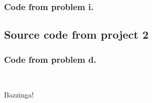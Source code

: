 \documentclass{article}
\begin{document}
\hypertarget{code_problem_h}{}



\subsubsection*{Code from problem i.}

\hypertarget{code_problem_i}{}



\subsection*{Source code from project 2}

\subsubsection*{Code from problem d.}

\hypertarget{code_problem_d}{}



\hypertarget{code_problem_f}{}



\hypertarget{code_problem_g}{}



\hypertarget{code_problem_h}{}



%



\

\bigskip
\bigskip
\bigskip
\bigskip

\begin{center}
Bazzinga!
\end{center}
\end{document}
